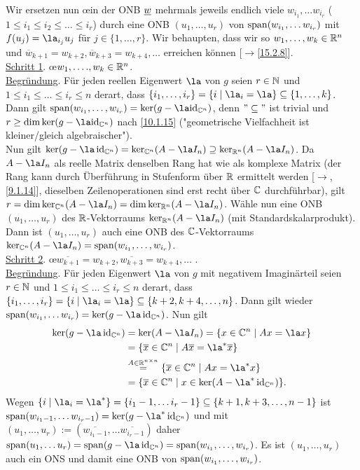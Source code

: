 \documentclass[../../main.tex]{subfiles}
\begin{document}
\begin{cproof}
\noindent Wir ersetzen nun \oe in der ONB ${\underline w}$ mehrmals jeweils endlich viele $w_{i_1},\ldots w_{i_r}$ ($1\le i_1\le i_2\le\ldots \le i_r$) durch eine ONB $(u_1,\ldots ,u_r)$ von $\operatorname{span}(w_{i_1},\ldots w_{i_r})$ mit $f(u_j)=\la_{i_j}u_j$ für $j\in\{1,\ldots ,r\}$. Wir behaupten, dass wir so $w_1,\ldots ,w_k\in \mathbb R^n$ und $\overline{w}_{k+1}=w_{k+2},\overline{w}_{k+3}=w_{k+4},\ldots $ erreichen können [$\to$\ref{15.2.8}].\\
		
\noindent\underline{Schritt 1}. \oe $w_1,\ldots .,w_k\in \mathbb R^n$.\\
\underline{Begründung}. Für jeden reellen Eigenwert $\la$ von $g$ seien $r\in \mathbb N$ und $1\le i_1\le\ldots \le i_r\le n$ derart, dass $\{i_1,\ldots ,i_r\}=\{i\mid \la_i=\la\}\subseteq\{1,\ldots ,k\}$. Dann gilt $\lin(w_{i_1},\ldots ,w_{i_r})=\ker(g-\la\text{id}_{\C^n})$, denn $"\subseteq"$ ist trivial und $r\ge \dim\ker(g-\la\text{id}_{\C^n})$ nach \ref{10.1.15} ("geometrische Vielfachheit ist kleiner/gleich algebraischer").\\
Nun gilt $\ker(g-\la\id_{\C^n})=\ker_{\C^n}(A-\la I_n)\supseteq \ker_{\R^n}(A-\la I_n)$. Da $A-\la I_n$ als reelle Matrix denselben Rang hat wie als komplexe Matrix (der Rang kann durch Überführung in Stufenform über $\mathbb R$ ermittelt werden [$\to$,\ref{9.1.14}], dieselben Zeilenoperationen sind erst recht über $\mathbb C$ durchführbar), gilt $r=\dim\ker_{\C^n}(A-\la I_n)=\dim\ker_{\R^n}(A-\la I_n)$. Wähle nun eine ONB $(u_1,\ldots ,u_r)$ des $\mathbb R$-Vektorraums $\ker_{\R^n}(A-\la I_n)$ (mit Standardskalarprodukt). Dann ist $(u_1,\ldots ,u_r)$ auch eine ONB des $\mathbb C$-Vektorraums $\ker_{\C^n}(A-\la I_n)=\lin(w_{i_1},\ldots ,w_{i_r})$.\\
		
\noindent\underline{Schritt 2}. \oe $\overline{w_{k+1}}=w_{k+2},\overline{w_{k+3}}=w_{k+4},\ldots $ .\\
\noindent\underline{Begründung}. Für jeden Eigenwert $\la$ von $g$ mit negativem Imaginärteil seien $r\in \mathbb N$ und $1\le i_1\le\ldots \le i_r\le n$ derart, dass $\{i_1,\ldots ,i_r\}=\{i\mid \la_i=\la\}\subseteq\{k+2,k+4,\ldots ,n\}$. Dann gilt wieder $\lin(w_{i_1},\ldots w_{i_r})=\ker(g-\la \id_{\C^n})$. Nun gilt
\begin{align*}
\ker(g-\la \id_{\C^n})&=\ker(A-\la I_n)=\{x\in \C^n\mid Ax=\la x\}\\
&=\{\overline{x}\in \C^n\mid A\overline{x}=\la^* \overline{x}\}\\
&\stackrel{A\in \R^{n\times n}}{=}\{\overline{x}\in \C^n\mid Ax=\la^* x\}\\
&=\{\overline{x}\in \C^n\mid x\in \ker(A-\la^* \id_{\C^n })\}.
\end{align*}
Wegen $\{i\mid \la_i=\la^*\}=\{i_1-1,\ldots i_r-1\}\subseteq\{k+1,k+3,\ldots ,n-1\}$ ist $\lin(w_{i_1-1},\ldots w_{i_r-1})=\ker(g-\la^*\id_{\C^n})$ und mit $(u_1,\ldots ,u_r):=(\overline{w_{i_1-1}},\ldots \overline{w_{i_r-1}})$ daher $\lin(u_1,\ldots u_r)=\lin(g-\la \id_{\C^n})=\lin(w_{i_1},\ldots ,w_{i_r})$. Es ist $(u_1,\ldots ,u_r)$ auch ein ONS und damit eine ONB von $\operatorname{span}(w_{i_1},\ldots ,w_{i_r})$.\\
		

\end{cproof}
\end{document}
